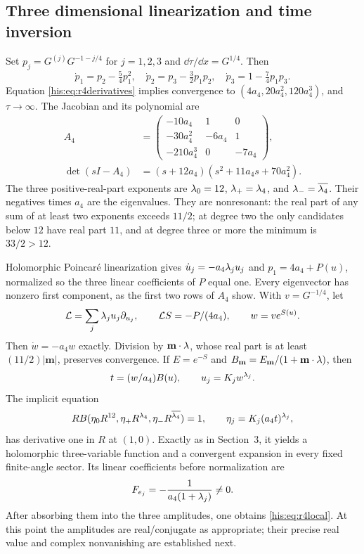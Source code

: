 \subsection{Three dimensional linearization and time inversion}
Set $p_j=G^{(j)}G^{-1-j/4}$ for $j=1,2,3$ and $\dd\tau/\dd x=G^{1/4}$. Then
\begin{equation}\label{his:eq:r4planar}
 \dot p_1=p_2-\tfrac54p_1^2,\quad
 \dot p_2=p_3-\tfrac32p_1p_2,\quad
 \dot p_3=1-\tfrac74p_1p_3.
\end{equation}
Equation \eqref{his:eq:r4derivatives} implies convergence to
$(4a_4,20a_4^2,120a_4^3)$, and $\tau\to\infty$. The Jacobian and its polynomial are
\begin{align}
 A_4&=\begin{pmatrix}-10a_4&1&0\\-30a_4^2&-6a_4&1\\-210a_4^3&0&-7a_4\end{pmatrix},\label{his:eq:r4jac}\\
 \det(sI-A_4)&=(s+12a_4)(s^2+11a_4s+70a_4^2).\nonumber
\end{align}
The three positive-real-part exponents are $\lambda_0=12$, $\lambda_+=\lambda_4$, and $\lambda_- =\overline{\lambda_4}$. Their negatives times $a_4$ are the eigenvalues. They are nonresonant: the real part of any sum of at least two exponents exceeds $11/2$; at degree two the only candidates below $12$ have real part $11$, and at degree three or more the minimum is $33/2>12$.

Holomorphic Poincar\'e linearization gives $\dot u_j=-a_4\lambda_j u_j$ and $p_1=4a_4+P(u)$, normalized so the three linear coefficients of $P$ equal one. Every eigenvector has nonzero first component, as the first two rows of $A_4$ show. With $v=G^{-1/4}$, let
\[
 \mathcal L=\sum_j\lambda_j u_j\partial_{u_j},\qquad
 \mathcal LS=-P/(4a_4),\qquad w=ve^{S(u)}.
\]
Then $\dot w=-a_4w$ exactly. Division by $\mathbf m\cdot\lambda$, whose real part is at least $(11/2)|\mathbf m|$, preserves convergence. If $E=e^{-S}$ and
$B_{\mathbf m}=E_{\mathbf m}/(1+\mathbf m\cdot\lambda)$, then
\[
 t=(w/a_4)B(u),\qquad u_j=K_jw^{\lambda_j}.
\]
The implicit equation
\[
 R B(\eta_0R^{12},\eta_+R^{\lambda_4},\eta_-R^{\overline{\lambda_4}})=1,
 \qquad \eta_j=K_j(a_4t)^{\lambda_j},
\]
has derivative one in $R$ at $(1,0)$. Exactly as in Section~3, it yields a holomorphic three-variable function and a convergent expansion in every fixed finite-angle sector. Its linear coefficients before normalization are
\begin{equation}\label{his:eq:r4linearcoeff}
 F_{e_j}=-\frac1{a_4(1+\lambda_j)}\ne0.
\end{equation}
After absorbing them into the three amplitudes, one obtains \eqref{his:eq:r4local}. At this point the amplitudes are real/conjugate as appropriate; their precise real value and complex nonvanishing are established next.

